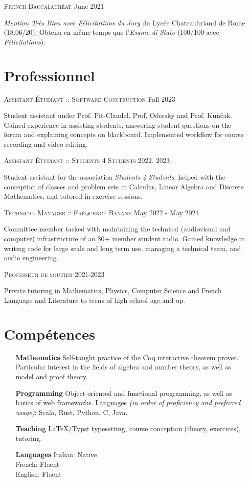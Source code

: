 \documentclass[11pt]{article}
\renewcommand{\line}[2]{{\vspace{4pt} \large \noindent\textsc{#1} \hfill #2}\vspace{4pt}}
\begin{document}
  \line{French Baccalauréat}{June 2021}

  \textit{Mention Très Bien avec Félicitations du Jury} du Lycée Chateaubriand de Rome (18.06/20). Obtenu en même temps que l'\textit{Esame di Stato} (100/100 avec \textit{Félicitations}).
  
  \section*{Professionnel}

  \line{Assistant Étudiant :: Software Construction}{Fall 2023}

  Student assistant under Prof. Pit-Claudel, Prof. Odersky and Prof. Kunčak. Gained experience in assisting students, answering student questions on the forum and explaining concepts on blackboard. Implemented workflow for course recording and video editing.

  \line{Assistant Étudiant :: Students 4 Students}{2022, 2023}

  Student assistant for the association \textit{Students 4 Students}: helped with the conception of classes and problem sets in Calculus, Linear Algebra and Discrete Mathematics, and tutored in exercise sessions.

  \line{Technical Manager :: Fréquence Banane}{May 2022 - May 2024}

  Committee member tasked with maintaining the technical (audiovisual and computer) infrastructure of an 80+ member student radio. Gained knowledge in writing code for large scale and long term use, managing a technical team, and audio engineering.

  \line{Professeur de soutien}{2021-2023}

  Private tutoring in Mathematics, Physics, Computer Science and French Language and Literature to teens of high school age and up.

  \section*{Compétences}
  
  \begin{adjustwidth}{1in}{}
    \begin{itemize}
      \item[\textbf{Mathematics}] Self-taught practice of the Coq interactive theorem prover. Particular interest in the fields of algebra and number theory, as well as model and proof theory. 
      \item[\textbf{Programming}] Object oriented and functional programming, as well as basics of web frameworks. Languages \textit{(in order of proficiency and preferred usage)}: Scala, Rust, Python, C, Java. 
      \item[\textbf{Teaching}] LaTeX/Typst typesetting, course conception (theory, exercices), tutoring.
      \item[\textbf{Languages}] Italian: Native \\ French: Fluent \\ English: Fluent
    \end{itemize}
  \end{adjustwidth}
\end{document}
